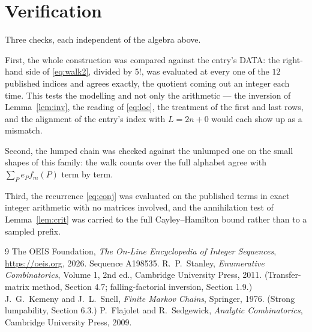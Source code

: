 \documentclass[11pt,a4paper]{article}
\theoremstyle{plain}
\theoremstyle{definition}
\begin{document}
\section{Verification}

Three checks, each independent of the algebra above.

First, the whole construction was compared against the entry's DATA: the right-hand side of
\eqref{eq:walk2}, divided by $5!$, was evaluated at every one of the $12$
published indices and agrees exactly, the quotient coming out an integer each time. This
tests the modelling and not only the arithmetic --- the inversion of Lemma~\ref{lem:inv},
the reading of \eqref{eq:loc}, the treatment of the first and last rows, and the
alignment of the entry's index with $L=2n+0$ would each show up as a mismatch.

Second, the lumped chain was checked against the unlumped one on the small shapes of this
family: the walk counts over the full alphabet agree with $\sum_P e_Pf_m(P)$ term by term.

Third, the recurrence \eqref{eq:conj} was evaluated on the published terms in exact integer
arithmetic with no matrices involved, and the annihilation test of Lemma~\ref{lem:crit} was
carried to the full Cayley--Hamilton bound rather than to a sampled prefix.

\begin{thebibliography}{9}
 The OEIS Foundation, \emph{The On-Line Encyclopedia of Integer
Sequences}, \url{https://oeis.org}, 2026. Sequence A198535.
 R.~P.~Stanley, \emph{Enumerative Combinatorics}, Volume 1, 2nd ed.,
Cambridge University Press, 2011. (Transfer-matrix method, Section 4.7; falling-factorial
inversion, Section 1.9.)
 J.~G.~Kemeny and J.~L.~Snell, \emph{Finite Markov Chains}, Springer,
1976. (Strong lumpability, Section 6.3.)
 P.~Flajolet and R.~Sedgewick, \emph{Analytic Combinatorics}, Cambridge
University Press, 2009.
\end{thebibliography}
\end{document}
